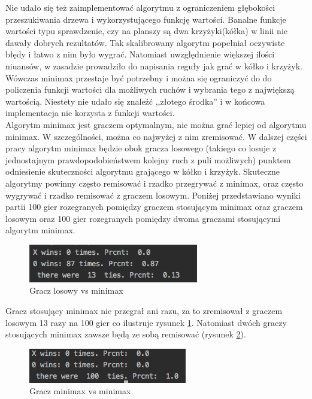 \documentclass[licencjacka]{pracamgr}
\begin{document}
Nie udało się też zaimplementować algorytmu z ograniczeniem głębokości przeszukiwania drzewa i wykorzystującego funkcję wartości. Banalne funkcje wartości typu sprawdzenie,  czy na planszy są dwa krzyżyki(kółka) w linii nie dawały dobrych rezultatów. Tak skalibrowany algorytm popełniał oczywiste błędy i łatwo z nim było wygrać.  Natomiast uwzględnienie większej ilości niuansów, w zasadzie prowadziło do napisania reguły jak grać w kółko i krzyżyk. Wówczas minimax przestaje być potrzebny i można się ograniczyć do do policzenia funkcji wartości dla możliwych ruchów i wybrania tego z największą wartością. Niestety nie udało się znaleźć ,,złotego środka'' i w końcowa implementacja nie korzysta z funkcji wartości. \\

Algorytm minimax jest graczem optymalnym, nie można grać lepiej od algorytmu minimax. W szczególności, można co najwyżej z nim zremisować. W dalszej części pracy algorytm minimax będzie obok gracza losowego (takiego co losuje z jednostajnym prawdopodobieństwem kolejny ruch z puli możliwych) punktem odniesienie skuteczności algorytmu grającego w kółko i krzyżyk. Skuteczne algorytmy powinny często remisować i rzadko przegrywać z minimax, oraz często wygrywać i rzadko remisować z graczem losowym. Poniżej przedstawiano wyniki partii 100 gier rozegranych pomiędzy graczem stosującym minimax oraz graczem losowym  oraz 100 gier rozegranych pomiędzy dwoma graczami stosującymi algorytm minimax.\\ 

\begin{figure}[h!]
	\includegraphics [scale=0.8] {random_minimax.png}
	\caption{Gracz losowy vs minimax}
	\label{Rys5}
\end{figure}

Gracz stosujący minimax nie przegrał ani razu, za to zremisował z graczem losowym 13 razy na 100 gier co ilustruje rysunek \ref{Rys5}. 
Natomiast dwóch graczy stosujących minimax zawsze będą ze sobą remisować (rysunek \ref{Rys6}). 

\begin{figure}[h!]
	\includegraphics [scale=0.8] {minimax_minimax.png}
	\caption{Gracz minimax vs minimax}
	\label{Rys6}
\end{figure}
\end{document}
